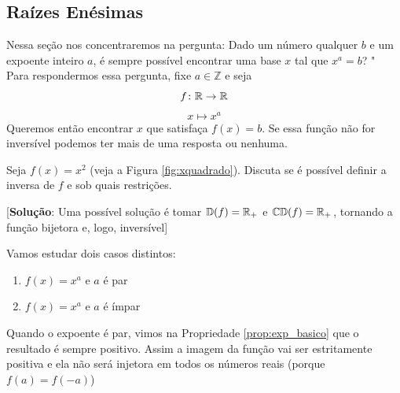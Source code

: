 \subsection{Raízes Enésimas}
Nessa seção nos concentraremos na pergunta: Dado um número qualquer $b$ e um expoente inteiro $a$, é sempre possível encontrar uma base $x$ tal que $x^a=b$? "\\Para respondermos essa pergunta, fixe $a \in \mathbb{Z}$ e seja $$f\colon \mathbb{R} \to \mathbb{R}$$ $$x \mapsto x^a$$Queremos então encontrar $x$ que satisfaça $f(x)=b$. Se essa função não for inversível podemos ter mais de uma resposta ou nenhuma.
\begin{inlinexer}Seja $f(x)=x^2$ (veja a Figura \ref{fig:xquadrado}). Discuta se é possível definir a inversa de $f$ e sob quais restrições.
\begin{flushright}
\footnotesize[\textbf{Solução}: Uma possível solução é tomar $\mathbb{D}(f)=\mathbb{R}_+$ e $\mathbb{CD}(f)=\mathbb{R}_+$, tornando a função bijetora e, logo, inversível]
\end{flushright}
\end{inlinexer}
Vamos estudar dois casos distintos: \begin{enumerate}[1)]
\item $f(x)=x^a$ e $a$ é par
\item $f(x)=x^a$ e $a$ é ímpar
\end{enumerate}
Quando o expoente é par, vimos na Propriedade \ref{prop:exp_basico} que o resultado é sempre positivo. Assim a imagem da função vai ser estritamente positiva e ela não será injetora em todos os números reais (porque $f(a)=f(-a)$)
